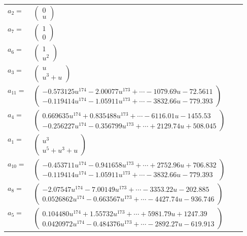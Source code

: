 \documentclass[1p]{elsarticle_modified}
\theoremstyle{definition}
\begin{document}
\begin{tabular}{m{7pt} m{180pt} m{7pt} m{180pt} }
\flushright $a_{2}=$&$\begin{pmatrix}0\\u\end{pmatrix}$ \\
\flushright $a_{7}=$&$\begin{pmatrix}1\\0\end{pmatrix}$ \\
\flushright $a_{6}=$&$\begin{pmatrix}1\\u^2\end{pmatrix}$ \\
\flushright $a_{3}=$&$\begin{pmatrix}u\\u^3+u\end{pmatrix}$ \\
\flushright $a_{11}=$&$\begin{pmatrix}-0.573125 u^{174}-2.00077 u^{173}+\cdots-1079.69 u-72.5611\\-0.119414 u^{174}-1.05911 u^{173}+\cdots-3832.66 u-779.393\end{pmatrix}$ \\
\flushright $a_{4}=$&$\begin{pmatrix}0.669635 u^{174}+0.835488 u^{173}+\cdots-6116.01 u-1455.53\\-0.256227 u^{174}-0.356799 u^{173}+\cdots+2129.74 u+508.045\end{pmatrix}$ \\
\flushright $a_{1}=$&$\begin{pmatrix}u^3\\u^5+u^3+u\end{pmatrix}$ \\
\flushright $a_{10}=$&$\begin{pmatrix}-0.453711 u^{174}-0.941658 u^{173}+\cdots+2752.96 u+706.832\\-0.119414 u^{174}-1.05911 u^{173}+\cdots-3832.66 u-779.393\end{pmatrix}$ \\
\flushright $a_{8}=$&$\begin{pmatrix}-2.07547 u^{174}-7.00149 u^{173}+\cdots-3353.22 u-202.885\\0.0526862 u^{174}-0.663567 u^{173}+\cdots-4427.74 u-936.746\end{pmatrix}$ \\
\flushright $a_{5}=$&$\begin{pmatrix}0.104480 u^{174}+1.55732 u^{173}+\cdots+5981.79 u+1247.39\\0.0420972 u^{174}-0.484376 u^{173}+\cdots-2892.27 u-619.913\end{pmatrix}$ \\

\end{tabular}
\end{document}
